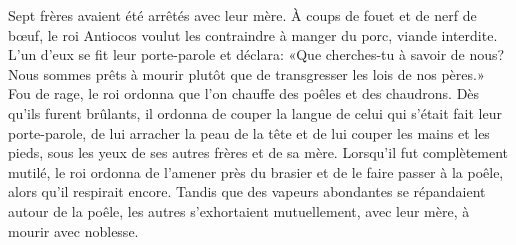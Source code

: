 Sept frères avaient été arrêtés avec leur mère.
À coups de fouet et de nerf de bœuf,
	le roi Antiocos voulut les contraindre à manger du porc, viande interdite.
L’un d’eux se fit leur porte-parole et déclara:
	«Que cherches-tu à savoir de nous?
	Nous sommes prêts à mourir plutôt que de transgresser les lois de nos pères.»
Fou de rage, le roi ordonna que l’on chauffe des poêles et des chaudrons.
Dès qu’ils furent brûlants,
	il ordonna de couper la langue de celui qui s’était fait leur porte-parole,
	de lui arracher la peau de la tête et de lui couper les mains et les pieds,
	sous les yeux de ses autres frères et de sa mère.
Lorsqu’il fut complètement mutilé,
	le roi ordonna de l’amener près du brasier et de le faire passer à la poêle,
	alors qu’il respirait encore.
Tandis que des vapeurs abondantes se répandaient autour de la poêle,
	les autres s’exhortaient mutuellement, avec leur mère, à mourir avec noblesse.
